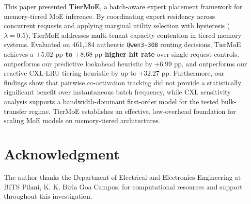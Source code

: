 \documentclass[10pt,journal,compsoc]{IEEEtran}
\begin{document}
This paper presented \textbf{TierMoE}, a batch-aware expert placement framework for memory-tiered MoE inference. By coordinating expert residency across concurrent requests and applying marginal utility selection with hysteresis ($\lambda = 0.5$), TierMoE addresses multi-tenant capacity contention in tiered memory systems. Evaluated on 461,184 authentic \texttt{Qwen3-30B} routing decisions, TierMoE achieves a \textbf{$+5.02\text{ pp}$ to $+8.68\text{ pp}$ higher hit rate} over single-request controls, outperforms our predictive lookahead heuristic by \textbf{$+6.99\text{ pp}$}, and outperforms our reactive CXL-LRU tiering heuristic by up to \textbf{$+32.27\text{ pp}$}. Furthermore, our findings show that pairwise co-activation tracking did not provide a statistically significant benefit over instantaneous batch frequency, while CXL sensitivity analysis supports a bandwidth-dominant first-order model for the tested bulk-transfer regime. TierMoE establishes an effective, low-overhead foundation for scaling MoE models on memory-tiered architectures.

\section*{Acknowledgment}
The author thanks the Department of Electrical and Electronics Engineering at BITS Pilani, K. K. Birla Goa Campus, for computational resources and support throughout this investigation.
\end{document}

